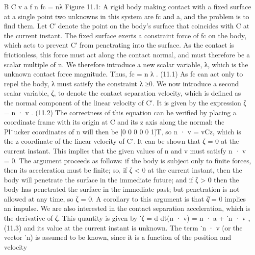 B C v a f n fc = nλ Figure 11.1: A rigid body making contact with a fixed surface at a single point two unknowns in this system are fc and a, and the problem is to find them. Let C′ denote the point on the body’s surface that coincides with C at the current instant. The fixed surface exerts a constraint force of fc on the body, which acts to prevent C′ from penetrating into the surface. As the contact is frictionless, this force must act along the contact normal, and must therefore be a scalar multiple of n. We therefore introduce a new scalar variable, λ, which is the unknown contact force magnitude. Thus, fc = n λ . (11.1) As fc can act only to repel the body, λ must satisfy the constraint λ ≥0. We now introduce a second scalar variable, ζ, to denote the contact separation velocity, which is defined as the normal component of the linear velocity of C′. It is given by the expression ζ = n · v . (11.2) The correctness of this equation can be verified by placing a coordinate frame with its origin at C and its z axis along the normal: the Pl¨ucker coordinates of n will then be [0 0 0 0 0 1]T, so n · v = vCz, which is the z coordinate of the linear velocity of C′. It can be shown that ζ = 0 at the current instant. This implies that the given values of n and v must satisfy n · v = 0. The argument proceeds as follows: if the body is subject only to finite forces, then its acceleration must be finite; so, if ζ < 0 at the current instant, then the body will penetrate the surface in the immediate future; and if ζ > 0 then the body has penetrated the surface in the immediate past; but penetration is not allowed at any time, so ζ = 0. A corollary to this argument is that ζ̸ = 0 implies an impulse. We are also interested in the contact separation acceleration, which is the derivative of ζ. This quantity is given by ˙ζ = d dt(n · v) = n · a + ˙n · v , (11.3) and its value at the current instant is unknown. The term ˙n · v (or the vector ˙n) is assumed to be known, since it is a function of the position and velocity

